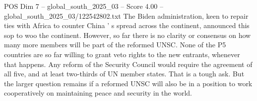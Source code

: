 \begin{textsample}{POS Dim 7 – global\_south\_2025\_03 – Score 4.00 – global\_south\_2025\_03/122542802.txt}
The Biden administration, keen to repair ties with Africa to counter China ' s spread across the continent, announced this sop to woo the continent.
However, so far there is no clarity or consensus on how many more members will be part of the reformed UNSC.
None of the P5 countries are so far willing to grant veto rights to the new entrants, whenever that happens.
Any reform of the Security Council would require the agreement of all five, and at least two-thirds of UN member states.
That is a tough ask.
But the larger question remains if a reformed UNSC will also be in a position to work cooperatively on maintaining peace and security in the world.

\end{textsample}
